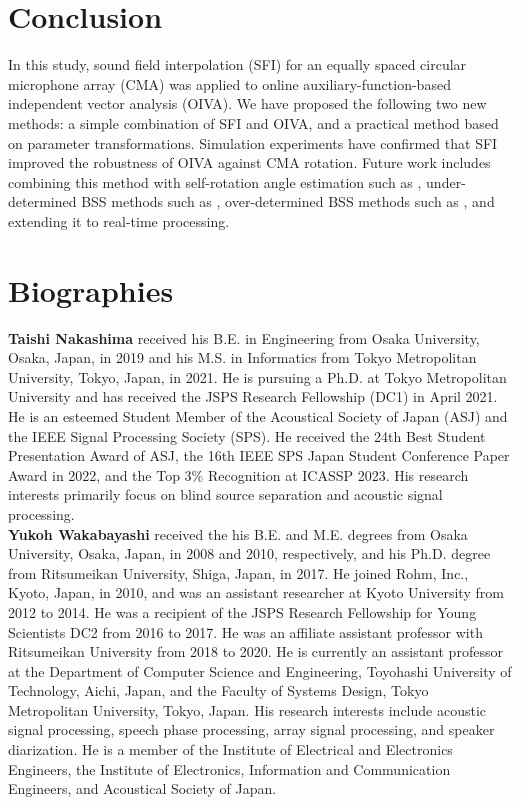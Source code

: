 \documentclass[sip,biber]{now-journal}
\begin{document}
\section{Conclusion}\label{sec:conclusion}

In this study, sound field interpolation (SFI) for an equally spaced circular microphone array (CMA) was applied to online auxiliary-function-based independent vector analysis (OIVA).
We have proposed the following two new methods: a simple combination of SFI and OIVA, and a practical method based on parameter transformations.
Simulation experiments have confirmed that SFI improved the robustness of OIVA against CMA rotation.
Future work includes combining this method with self-rotation angle estimation such as \cite{Lian:2021:APSIPA}, under-determined BSS methods such as \cite{Yamaoka:2019:EUSIPCO,Yamaoka:2021:ASLP}, over-determined BSS methods such as \cite{Scheibler:2019:WASPAA,Ikeshita:2020:ICASSP}, and extending it to real-time processing.

\section*{Biographies}

\noindent\normalsize\textbf{Taishi Nakashima}
received his B.E. in Engineering from Osaka University, Osaka, Japan, in 2019 and his M.S. in Informatics from Tokyo Metropolitan University, Tokyo, Japan, in 2021.
He is pursuing a Ph.D. at Tokyo Metropolitan University and has received the JSPS Research Fellowship (DC1) in April 2021.
He is an esteemed Student Member of the Acoustical Society of Japan (ASJ) and the IEEE Signal Processing Society (SPS).
He received the 24th Best Student Presentation Award of ASJ, the 16th IEEE SPS Japan Student Conference Paper Award in 2022, and the Top 3\% Recognition at ICASSP 2023.
His research interests primarily focus on blind source separation and acoustic signal processing.
\\

\noindent\normalsize\textbf{Yukoh Wakabayashi}
received the his B.E. and M.E. degrees from Osaka University, Osaka, Japan, in 2008 and 2010, respectively, and his Ph.D. degree from Ritsumeikan University, Shiga, Japan, in 2017.
He joined Rohm, Inc., Kyoto, Japan, in 2010, and was an assistant researcher at Kyoto University from 2012 to 2014.
He was a recipient of the JSPS Research Fellowship for Young Scientists DC2 from 2016 to 2017.
He was an affiliate assistant professor with Ritsumeikan University from 2018 to 2020.
He is currently an assistant professor at the Department of Computer Science and Engineering, Toyohashi University of Technology, Aichi, Japan, and the Faculty of Systems Design, Tokyo Metropolitan University, Tokyo, Japan.
His research interests include acoustic signal processing, speech phase processing, array signal processing, and speaker diarization.
He is a member of the Institute of Electrical and Electronics Engineers, the Institute of Electronics, Information and Communication Engineers, and Acoustical Society of Japan.
\\
\end{document}
